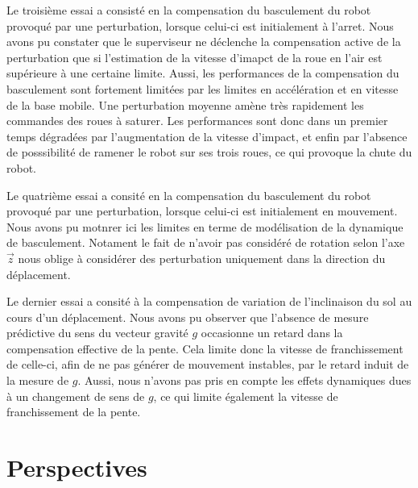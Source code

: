 	  Le troisième essai a consisté en la compensation du basculement du robot provoqué par une perturbation, lorsque celui-ci est initialement à l'arret.
	  Nous avons pu constater que le superviseur ne déclenche la compensation active de la perturbation que si l'estimation de la vitesse d'imapct de la roue en l'air est supérieure à une certaine limite.
	  Aussi, les performances de la compensation du basculement sont fortement limitées par les limites en accélération et en vitesse de la base mobile.
	  Une perturbation moyenne amène très rapidement les commandes des roues à saturer.
	  Les performances sont donc dans un premier temps dégradées par l'augmentation de la vitesse d'impact, et enfin par l'absence de posssibilité de ramener le robot sur ses trois roues, ce qui provoque la chute du robot.
	
	  Le quatrième essai a consité en la compensation du basculement du robot provoqué par une perturbation, lorsque celui-ci est initialement en mouvement.
	  Nous avons pu motnrer ici les limites en terme de modélisation de la dynamique de basculement. 
	  Notament le fait de n'avoir pas considéré de rotation selon l'axe $\vec{z}$ nous oblige à considérer des perturbation uniquement dans la direction du déplacement.
	  
	  Le dernier essai a consité à la compensation de variation de l'inclinaison du sol au cours d'un déplacement.
	  Nous avons pu observer que l'absence de mesure prédictive du sens du vecteur gravité $g$ occasionne un retard dans la compensation effective de la pente.
	  Cela limite donc la vitesse de franchissement de celle-ci, afin de ne pas générer de mouvement instables, par le retard induit de la mesure de $g$.
	  Aussi, nous n'avons pas pris en compte les effets dynamiques dues à un changement de sens de $g$, ce qui limite également la vitesse de franchissement de la pente.
	  
	\section{Perspectives}
	
	  